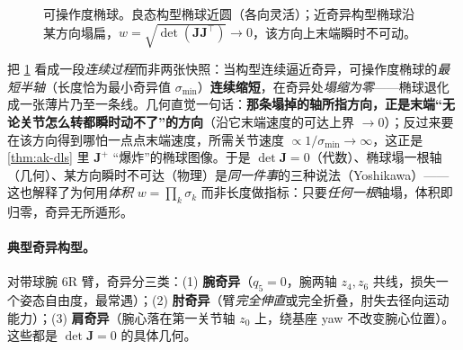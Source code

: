 \begin{figure}[ht]
\centering
{}
\caption{可操作度椭球。良态构型椭球近圆（各向灵活）；近奇异构型椭球沿某方向塌扁，$w=\sqrt{\det(\mathbf{J}\mathbf{J}^\top)}\to0$，该方向上末端瞬时不可动。}
\label{fig:ak-manip-ellipsoid}
\end{figure}

\begin{insight}[趋近奇异 = 椭球某轴连续塌为线 = 那个方向被“冻结”]
把 \cref{fig:ak-manip-ellipsoid} 看成一段\emph{连续过程}而非两张快照：当构型连续逼近奇异，可操作度椭球的\emph{最短半轴}（长度恰为最小奇异值 $\sigma_{\min}$）\textbf{连续缩短}，在奇异处\emph{塌缩为零}——椭球退化成一张薄片乃至一条线。几何直觉一句话：\textbf{那条塌掉的轴所指方向，正是末端“无论关节怎么转都瞬时动不了”的方向}（沿它末端速度的可达上界 $\to0$）；反过来要在该方向得到哪怕一点点末端速度，所需关节速度 $\propto1/\sigma_{\min}\to\infty$，这正是 \cref{thm:ak-dls} 里 $\mathbf{J}^{+}$ “爆炸”的椭球图像。于是 $\det\mathbf{J}=0$（代数）、椭球塌一根轴（几何）、某方向瞬时不可达（物理）是\emph{同一件事}的三种说法（Yoshikawa）\cite{yoshikawa1985manipulability}——这也解释了为何用\emph{体积} $w=\prod_k\sigma_k$ 而非长度做指标：只要\emph{任何一根}轴塌，体积即归零，奇异无所遁形。
\end{insight}

\paragraph{典型奇异构型。}
对带球腕 6R 臂，奇异分三类\cite{spong2006robot}：(1) \textbf{腕奇异}（$q_5=0$，腕两轴 $z_4,z_6$ 共线，损失一个姿态自由度，最常遇）；(2) \textbf{肘奇异}（臂\emph{完全伸直}或完全折叠，肘失去径向运动能力）；(3) \textbf{肩奇异}（腕心落在第一关节轴 $z_0$ 上，绕基座 yaw 不改变腕心位置）。这些都是 $\det\mathbf{J}=0$ 的具体几何。

